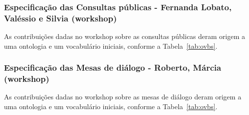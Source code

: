 \documentclass[12pt]{article}
\begin{document}
\subsubsection{Especificação das Consultas públicas - Fernanda Lobato, Valéssio e Silvia (workshop)}
As contribuições dadas no workshop sobre as consultas públicas deram origem a uma ontologia e um vocabulário iniciais, conforme a Tabela~\ref{tab:ovbs}.

\subsubsection{Especificação das Mesas de diálogo - Roberto, Márcia (workshop)}
As contribuições dadas no workshop sobre as mesas de diálogo deram origem a uma ontologia e um vocabulário iniciais, conforme a Tabela~\ref{tab:ovbs}.
\end{document}

